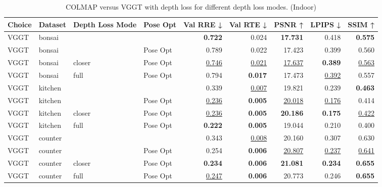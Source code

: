 \begin{table}[H]
\caption{\ifdefined\customcaption \customcaption \else COLMAP versus VGGT with depth loss for different depth loss modes. (Indoor) \fi}
\label{tab:05_depth_loss_mode_pose_opt_indoor}
\centering
\scriptsize
\begin{tabular}{llllrrrrr}
\toprule
Choice & Dataset & Depth Loss Mode & Pose Opt & Val RRE ↓ & Val RTE ↓ & PSNR ↑ & LPIPS ↓ & SSIM ↑ \\
\midrule
VGGT & bonsai &  &  & \textbf{0.722} & 0.024 & \textbf{17.731} & 0.418 & \textbf{0.575} \\
VGGT & bonsai &  & Pose Opt & 0.789 & 0.022 & 17.423 & 0.399 & 0.560 \\
VGGT & bonsai & closer & Pose Opt & \underline{0.746} & \underline{0.021} & \underline{17.637} & \textbf{0.389} & \underline{0.563} \\
VGGT & bonsai & full & Pose Opt & 0.794 & \textbf{0.017} & 17.473 & \underline{0.392} & 0.557 \\
\midrule
VGGT & kitchen &  &  & 0.339 & \underline{0.007} & 19.821 & 0.239 & \textbf{0.463} \\
VGGT & kitchen &  & Pose Opt & \underline{0.236} & \textbf{0.005} & \underline{20.018} & \underline{0.176} & 0.414 \\
VGGT & kitchen & closer & Pose Opt & \underline{0.236} & \textbf{0.005} & \textbf{20.186} & \textbf{0.175} & \underline{0.422} \\
VGGT & kitchen & full & Pose Opt & \textbf{0.222} & \textbf{0.005} & 19.044 & 0.210 & 0.400 \\
\midrule
VGGT & counter &  &  & 0.343 & \underline{0.008} & 20.160 & 0.307 & 0.630 \\
VGGT & counter &  & Pose Opt & 0.254 & \textbf{0.006} & \underline{20.807} & \underline{0.237} & \underline{0.641} \\
VGGT & counter & closer & Pose Opt & \textbf{0.234} & \textbf{0.006} & \textbf{21.081} & \textbf{0.234} & \textbf{0.655} \\
VGGT & counter & full & Pose Opt & \underline{0.247} & \textbf{0.006} & 20.773 & 0.246 & \textbf{0.655} \\
\bottomrule
\end{tabular}
\end{table}